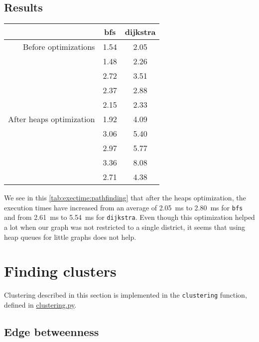 \documentclass[12pt,english]{article}
\begin{document}
	\subsection{Results}\label{sec:results:2}

	\begin{center}
		\begin{tabular}{r c c}
			& \textbf{\ttfamily bfs} & \textbf{\ttfamily dijkstra}\\
			\hline\hline
			Before optimizations & \num{1.54} & \num{2.05}\\
			& \num{1.48} & \num{2.26}\\
			& \num{2.72} & \num{3.51}\\
			& \num{2.37} & \num{2.88}\\
			& \num{2.15} & \num{2.33}\\
			\hline
			After heaps optimization & \num{1.92} & \num{4.09}\\
			& \num{3.06} & \num{5.40}\\
			& \num{2.97} & \num{5.77}\\
			& \num{3.36} & \num{8.08}\\
			& \num{2.71} & \num{4.38}\\
		\end{tabular}
		\label{tab:exectime:pathfinding}
	\end{center}
	We see in this \autoref{tab:exectime:pathfinding} that after the heaps optimization, the execution times have increased from an average of \SI{2.05}{\milli\second} to \SI{2.80}{\milli\second} for \texttt{bfs} and from \SI{2.61}{\milli\second} to \SI{5.54}{\milli\second} for \texttt{dijkstra}.
	Even though this optimization helped a lot when our graph was not restricted to a single district, it seems that using heap queues for little graphs does not help.

	\section{Finding clusters}\label{sec:step:3}

	Clustering described in this section is implemented in the \texttt{clustering} function, defined in \hyperref[sec:code:clustering]{\ttfamily clustering.py}.

	\subsection{Edge betweenness}\label{sec:step:3.1}
\end{document}
